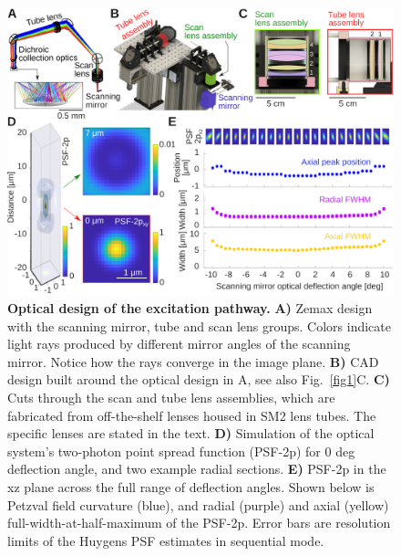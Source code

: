 \documentclass[10pt,letterpaper]{article}
\begin{document}
\begin{figure}[!t]
    \includegraphics[width=\textwidth]{fig2.jpg}
    \caption{{\bf Optical design of the excitation pathway.} \textbf{A)} Zemax design with the scanning mirror, tube and scan lens groups. Colors indicate light rays produced by different mirror angles of the scanning mirror. Notice how the rays converge in the image plane. \textbf{B)} CAD design built around the optical design in A, see also Fig.~\ref{fig1}C. \textbf{C)} Cuts through the scan and tube lens assemblies, which are fabricated from off-the-shelf lenses housed in SM2 lens tubes. The specific lenses are stated in the text. \textbf{D)} Simulation of the optical system's two-photon point spread function (PSF-2p) for 0 deg deflection angle, and two example radial sections. \textbf{E)} PSF-2p in the xz plane across the full range of deflection angles. Shown below is Petzval field curvature (blue), and radial (purple) and axial (yellow) full-width-at-half-maximum of the PSF-2p. Error bars are resolution limits of the Huygens PSF estimates in sequential mode.}
    \label{fig2}
\end{figure}
%
\end{document}

